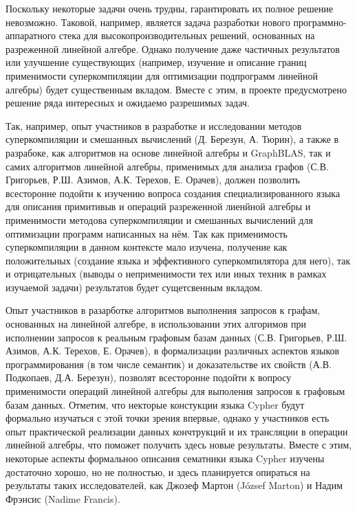 \documentclass[12pt]{article}  %
\theoremstyle{remark}
\begin{document}
Поскольку некоторые задачи очень трудны, гарантировать их полное решение невозможно. Таковой, например, является задача разработки нового программно-аппаратного стека для высокопроизводительных решений, основанных на разреженной линейной алгебре. Однако получение даже частичных результатов или улучшение существующих (например, изучение и описание границ применимости суперкомпиляции для оптимизации подпрограмм линейной алгебры) будет существенным вкладом. Вместе с этим, в проекте предусмотрено решение ряда интересных и ожидаемо разрешимых задач.

Так, например, опыт участников в разработке и исследовании методов суперкомпиляции и смешанных вычислений (Д. Березун, А. Тюрин), а также в разрабоке, как алгоритмов на основе линейной алгебры и GraphBLAS, так и самих алгоритмов линейной алгебры, применимых для анализа графов (С.В. Григорьев, Р.Ш. Азимов, А.К. Терехов, Е. Орачев), должен позволить всесторонне подойти к изучению вопроса создания специализированного языка для описания примитивыв и операций разреженной лиенйной алгебры и применимости методова суперкомпиляции и смешанных вычислений для оптимизации программ написанных на нём. Так как применимость суперкомпиляции в данном контексте мало изучена, получение как положительных (создание языка и эффективного суперкомпилятора для него), так и отрицательных (выводы о неприменимости тех или иных техник  в рамках изучаемой задачи) результатов будет сущетсвенным вкладом.

Опыт участников в разарботке алгоритмов выполнения запросов к графам, основанных на линейной алгебре, в использовании этих алгоримов при исполнении запросов к реальным графовым базам данных (С.В. Григорьев, Р.Ш. Азимов, А.К. Терехов, Е. Орачев), в формализации различных аспектов языков программирования (в том числе семантик) и доказательстве их свойств (А.В. Подкопаев, Д.А. Березун), позволят всесторонне подойти к вопросу применимости операций линейной алгебры для выполения запросов к графовым базам данных. Отметим, что некторые констукции языка Cypher будут формально изучаться с этой точки зрения впервые, однако у участников есть опыт практической реализации данных кончтрукций и их трансляции в операции линейной алгебры, что поможет получить здесь новые результаты. Вместе с этим, некоторые аспекты формальноо описания сематники языка Cypher изучены достаточно хорошо, но не полностью, и здесь планируется опираться на результаты таких исследователей, как Джозеф Мартон (József Marton) и Надим Фрэнсис (Nadime Francis).
\end{document}
